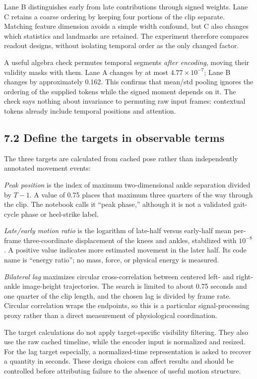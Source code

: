 \documentclass[11pt,letterpaper]{article}
\begin{document}
Lane B distinguishes early from late contributions through signed
weights. Lane C retains a coarse ordering by keeping four portions of
the clip separate. Matching feature dimension avoids a simple width
confound, but C also changes which statistics and landmarks are
retained. The experiment therefore compares readout designs, without
isolating temporal order as the only changed factor.

A useful algebra check permutes temporal segments \emph{after encoding},
moving their validity masks with them. Lane A changes by at most
\(4.77\times10^{-7}\); Lane B changes by approximately 0.162. This
confirms that mean/std pooling ignores the ordering of the supplied
tokens while the signed moment depends on it. The check says nothing
about invariance to permuting raw input frames: contextual tokens
already include temporal positions and attention.

\subsection{7.2 Define the targets in observable
terms}\label{define-the-targets-in-observable-terms}

The three targets are calculated from cached pose rather than
independently annotated movement events:

\emph{Peak position} is the index of maximum two-dimensional ankle
separation divided by \(T-1\). A value of 0.75 places that maximum three
quarters of the way through the clip. The notebook calls it ``peak
phase,'' although it is not a validated gait-cycle phase or heel-strike
label.

\emph{Late/early motion ratio} is the logarithm of late-half versus
early-half mean per-frame three-coordinate displacement of the knees and
ankles, stabilized with \(10^{-8}\). A positive value indicates more
estimated movement in the later half. Its code name is ``energy ratio'';
no mass, force, or physical energy is measured.

\emph{Bilateral lag} maximizes circular cross-correlation between
centered left- and right-ankle image-height trajectories. The search is
limited to about 0.75 seconds and one quarter of the clip length, and
the chosen lag is divided by frame rate. Circular correlation wraps the
endpoints, so this is a particular signal-processing proxy rather than a
direct measurement of physiological coordination.

The target calculations do not apply target-specific visibility
filtering. They also use the raw cached timeline, while the encoder
input is normalized and resized. For the lag target especially, a
normalized-time representation is asked to recover a quantity in
seconds. These design choices can affect results and should be
controlled before attributing failure to the absence of useful motion
structure.
\end{document}
